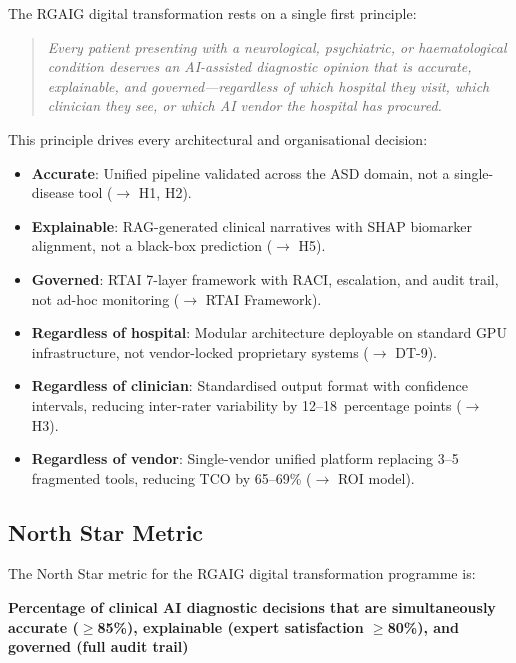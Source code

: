 The RGAIG digital transformation rests on a single first principle:

\begin{quote}
\textit{Every patient presenting with a neurological, psychiatric, or haematological condition deserves an AI-assisted diagnostic opinion that is accurate, explainable, and governed---regardless of which hospital they visit, which clinician they see, or which AI vendor the hospital has procured.}
\end{quote}

\noindent This principle drives every architectural and organisational decision:

\begin{itemize}
\item \textbf{Accurate}: Unified pipeline validated across the ASD domain, not a single-disease tool ($\rightarrow$ H1, H2).
\item \textbf{Explainable}: RAG-generated clinical narratives with SHAP biomarker alignment, not a black-box prediction ($\rightarrow$ H5).
\item \textbf{Governed}: RTAI 7-layer framework with RACI, escalation, and audit trail, not ad-hoc monitoring ($\rightarrow$ RTAI Framework).
\item \textbf{Regardless of hospital}: Modular architecture deployable on standard GPU infrastructure, not vendor-locked proprietary systems ($\rightarrow$ DT-9).
\item \textbf{Regardless of clinician}: Standardised output format with confidence intervals, reducing inter-rater variability by 12--18~percentage points ($\rightarrow$ H3).
\item \textbf{Regardless of vendor}: Single-vendor unified platform replacing 3--5 fragmented tools, reducing TCO by 65--69\% ($\rightarrow$ ROI model).
\end{itemize}

\subsection{North Star Metric}

The North Star metric for the RGAIG digital transformation programme is:

\begin{center}
\textbf{Percentage of clinical AI diagnostic decisions that are simultaneously accurate ($\geq$85\%), explainable (expert satisfaction $\geq$80\%), and governed (full audit trail)}
\end{center}

